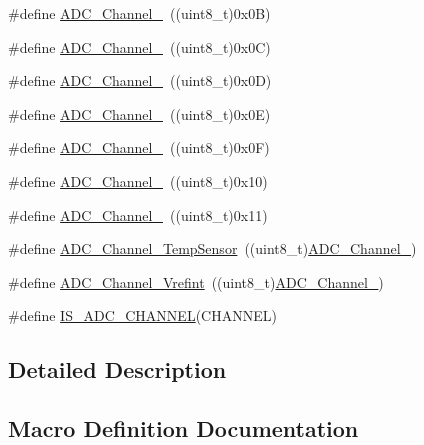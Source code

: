 \begin{DoxyCompactItemize}
\#define \mbox{\hyperlink{group___a_d_c__channels_ga5bfc40d938f384f22665f6e2dd945cfd}{A\+D\+C\+\_\+\+Channel\+\_}}~((uint8\+\_\+t)0x0\+B)
\item 
\#define \mbox{\hyperlink{group___a_d_c__channels_gaa1e35f7870ae8f05013a681293175299}{A\+D\+C\+\_\+\+Channel\+\_}}~((uint8\+\_\+t)0x0\+C)
\item 
\#define \mbox{\hyperlink{group___a_d_c__channels_ga517cda911256f722eb067d7140663230}{A\+D\+C\+\_\+\+Channel\+\_}}~((uint8\+\_\+t)0x0\+D)
\item 
\#define \mbox{\hyperlink{group___a_d_c__channels_gaf1830a03fe4a3820fde4f41ba907c394}{A\+D\+C\+\_\+\+Channel\+\_}}~((uint8\+\_\+t)0x0\+E)
\item 
\#define \mbox{\hyperlink{group___a_d_c__channels_ga01431a7b4e388beb241328874abdf88c}{A\+D\+C\+\_\+\+Channel\+\_}}~((uint8\+\_\+t)0x0\+F)
\item 
\#define \mbox{\hyperlink{group___a_d_c__channels_ga52fb09ae9a0333a0e071da106466c659}{A\+D\+C\+\_\+\+Channel\+\_}}~((uint8\+\_\+t)0x10)
\item 
\#define \mbox{\hyperlink{group___a_d_c__channels_ga58cdfe3a5625f198116d163b09698cea}{A\+D\+C\+\_\+\+Channel\+\_}}~((uint8\+\_\+t)0x11)
\item 
\#define \mbox{\hyperlink{group___a_d_c__channels_ga1efc096b8d4a8d15c4a7d91f5c03c6c7}{A\+D\+C\+\_\+\+Channel\+\_\+\+Temp\+Sensor}}~((uint8\+\_\+t)\mbox{\hyperlink{group___a_d_c__channels_ga52fb09ae9a0333a0e071da106466c659}{A\+D\+C\+\_\+\+Channel\+\_}})
\item 
\#define \mbox{\hyperlink{group___a_d_c__channels_ga5d48ded5138e6f1efe3a7634eff4d125}{A\+D\+C\+\_\+\+Channel\+\_\+\+Vrefint}}~((uint8\+\_\+t)\mbox{\hyperlink{group___a_d_c__channels_ga58cdfe3a5625f198116d163b09698cea}{A\+D\+C\+\_\+\+Channel\+\_}})
\item 
\#define \mbox{\hyperlink{group___a_d_c__channels_gaba41910dcb2b449c613a5ef638862e77}{I\+S\+\_\+\+A\+D\+C\+\_\+\+C\+H\+A\+N\+N\+EL}}(C\+H\+A\+N\+N\+EL)
\end{DoxyCompactItemize}


\subsection{Detailed Description}


\subsection{Macro Definition Documentation}
\mbox{\label{group___a_d_c__channels_ga40ec353803e9470a5721ef5bf0b1ab24}} 
